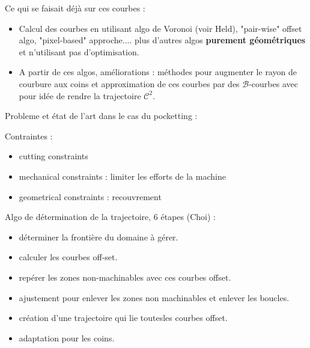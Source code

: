 \documentclass[11pt,a4paper]{article}
\begin{document}
\begin{itemize}
		\vspace{0cm}
		
		Ce qui se faisait déjà sur ces courbes :
		\begin{itemize}
			\item Calcul des courbes  en utilisant algo de Voronoi (voir Held), "pair-wise" offset algo, "pixel-based" approche.... plus d'autres algos \textbf{purement géométriques} et n'utilisant pas d'optimisation.
			
			\item A partir de ces algos, améliorations : méthodes pour augmenter le rayon de courbure aux coins et approximation de ces courbes par des $\mathcal{B}$-courbes avec pour idée de rendre la trajectoire $\mathcal{C}^2$.
		\end{itemize}
		
		Probleme et état de l'art dans le cas du pocketting :
		
		\vspace{0cm}
		
		Contraintes : 
		\begin{itemize}
			\item cutting constraints 
			\item mechanical constraints : limiter les efforts de la machine
			\item geometrical constraints : recouvrement
		\end{itemize}
		
		Algo de détermination de la trajectoire, 6 étapes (Choi) :
		\begin{itemize}
			\item déterminer la frontière du domaine à gérer.
			\item calculer les courbes off-set.
			\item repérer les zones non-machinables avec ces courbes offset.
			\item ajustement pour enlever les zones non machinables et enlever les boucles.
			\item création d'une trajectoire qui lie toutesles courbes offset.
			\item adaptation pour les coins.
		\end{itemize}
		

\end{itemize}
\end{document}
